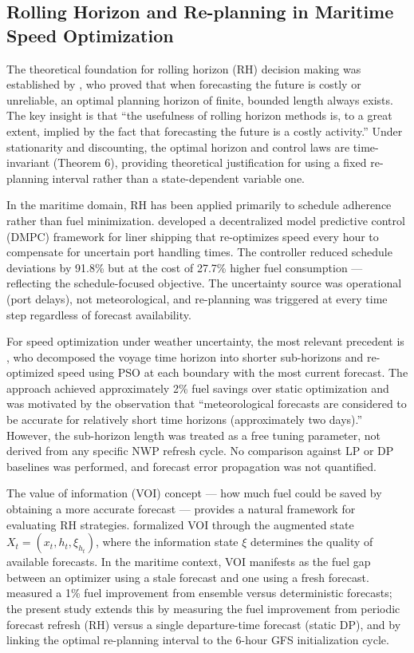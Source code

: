 \documentclass[review]{elsarticle}
\begin{document}
\subsection{Rolling Horizon and Re-planning in Maritime Speed Optimization}
\label{sec:lit-rh}

The theoretical foundation for rolling horizon (RH) decision making was established by \cite{Sethi1991}, who proved that when forecasting the future is costly or unreliable, an optimal planning horizon of finite, bounded length always exists. The key insight is that ``the usefulness of rolling horizon methods is, to a great extent, implied by the fact that forecasting the future is a costly activity.'' Under stationarity and discounting, the optimal horizon and control laws are time-invariant (Theorem 6), providing theoretical justification for using a fixed re-planning interval rather than a state-dependent variable one.

In the maritime domain, RH has been applied primarily to schedule adherence rather than fuel minimization. \cite{Zheng2023} developed a decentralized model predictive control (DMPC) framework for liner shipping that re-optimizes speed every hour to compensate for uncertain port handling times. The controller reduced schedule deviations by 91.8\% but at the cost of 27.7\% higher fuel consumption --- reflecting the schedule-focused objective. The uncertainty source was operational (port delays), not meteorological, and re-planning was triggered at every time step regardless of forecast availability.

For speed optimization under weather uncertainty, the most relevant precedent is \cite{Tzortzis2021}, who decomposed the voyage time horizon into shorter sub-horizons and re-optimized speed using PSO at each boundary with the most current forecast. The approach achieved approximately 2\% fuel savings over static optimization and was motivated by the observation that ``meteorological forecasts are considered to be accurate for relatively short time horizons (approximately two days).'' However, the sub-horizon length was treated as a free tuning parameter, not derived from any specific NWP refresh cycle. No comparison against LP or DP baselines was performed, and forecast error propagation was not quantified.

The value of information (VOI) concept --- how much fuel could be saved by obtaining a more accurate forecast --- provides a natural framework for evaluating RH strategies. \cite{Sethi1991} formalized VOI through the augmented state $X_t = (x_t, h_t, \xi_{h_t})$, where the information state $\xi$ determines the quality of available forecasts. In the maritime context, VOI manifests as the fuel gap between an optimizer using a stale forecast and one using a fresh forecast. \cite{Luo2023} measured a 1\% fuel improvement from ensemble versus deterministic forecasts; the present study extends this by measuring the fuel improvement from periodic forecast refresh (RH) versus a single departure-time forecast (static DP), and by linking the optimal re-planning interval to the 6-hour GFS initialization cycle.
\end{document}
